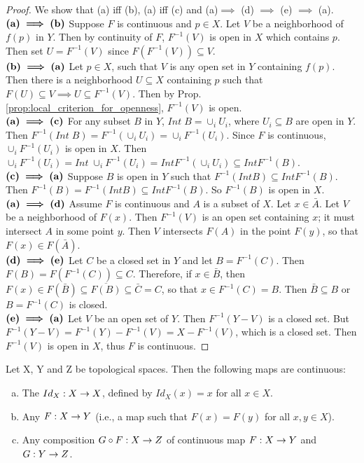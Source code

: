\documentclass[11pt,a4paper]{article}
\begin{document}
\begin{proof}
    We show that (a) iff (b), (a) iff (c) and (a)$\implies$ (d) $\implies$ (e) $\implies$ (a).\\
    $\textbf{(a)}\boldsymbol{\implies}\textbf{(b)}$ Suppose $F$ is continuous and $p\in X$. Let $V$ be a neighborhood of $f(p)$ in $Y$. Then by continuity of $F$, $F^{-1}(V)$ is open in $X$ which contains $p$. Then set $U = F^{-1}(V)$ since $F(F^{-1}(V))\subseteq V$. \\
    $\textbf{(b)}\boldsymbol{\implies}\textbf{(a)}$ Let $p\in X$, such that $V$ is any open set in $Y$ containing $f(p)$. Then there is a neighborhood $U\subseteq X$ containing $p$ such that $F(U)\subseteq V\implies U\subseteq F^{-1}(V)$. Then by Prop. \ref{prop:local_criterion_for_openness}, $F^{-1}(V)$ is open. 
    \\
    $\textbf{(a)}\boldsymbol{\implies}\textbf{(c)}$ For any subset $B$ in $Y$, $Int\;B = \cup_i U_i$, where $U_i\subseteq B$ are open in $Y$. Then $F^{-1}(Int\;B) = F^{-1}(\cup_i U_i) = \cup_i F^{-1}(U_i)$. Since $F$ is continuous, $\cup_i F^{-1}(U_i)$ is open in $X$. Then $\cup_i F^{-1}(U_i) = Int\;\cup_i F^{-1}(U_i) = Int F^{-1}(\cup_i U_i) \subseteq Int F^{-1}(B)$.\\
    $\textbf{(c)}\boldsymbol{\implies}\textbf{(a)}$ Suppose $B$ is open in $Y$ such that $F^{-1}(Int B)\subseteq Int F^{-1}(B)$. Then $F^{-1}(B) = F^{-1}(Int B)\subseteq Int F^{-1}(B)$. So $F^{-1}(B)$ is open in $X$.
    \\
    $\textbf{(a)}\boldsymbol{\implies}\textbf{(d)}$ Assume $F$ is continuous and $A$ is a subset of $X$. Let $x\in \bar{A}$. Let $V$ be a neighborhood of $F(x)$. Then $F^{-1}(V)$ is an open set containing $x$; it must intersect $A$ in some point $y$. Then $V$ intersects $F(A)$ in the point $F(y)$, so that $F(x)\in F(\bar{A})$.\\
    $\textbf{(d)}\boldsymbol{\implies}\textbf{(e)}$ Let $C$ be a closed set in $Y$ and let $B = F^{-1}(C)$. Then $F(B) = F(F^{-1}(C))\subseteq C.$ Therefore, if $x\in \bar{B}$, then $F(x)\in F(\bar{B})\subseteq \overline{F(B)}\subseteq \bar{C} = C$, so that $x\in F^{-1}(C) = B$. Then $\bar{B}\subseteq B$ or $B = F^{-1}(C)$ is closed.\\
    $\textbf{(e)}\boldsymbol{\implies}\textbf{(a)}$ Let $V$ be an open set of $Y$. Then $F^{-1}(Y-V)$ is a closed set. But $F^{-1}(Y - V) = F^{-1}(Y) - F^{-1}(V) = X - F^{-1}(V)$, which is a closed set. Then $F^{-1}(V)$ is open in $X$, thus $F$ is continuous.
\end{proof}

\begin{prop}
    Let X, Y and Z be topological spaces. Then the following maps are continuous:
    \begin{enumerate}[(a)]
        \item The  $Id_X:X\rightarrow X$, defined by $Id_X(x)=x$ for all $x\in X$.
        \item Any  $F:X\rightarrow Y$ (i.e., a map such that $F(x)=F(y)$ for all $x,y\in X$).
        \item Any composition $G\circ F:X\rightarrow Z$ of continuous map $F:X\rightarrow Y$ and $G:Y\rightarrow Z$.
    \end{enumerate}
\end{prop}
\end{document}
